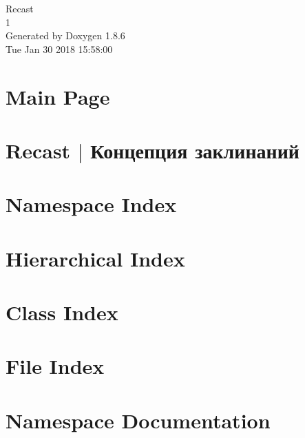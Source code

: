 \documentclass[twoside]{book}
\newcommand{\clearemptydoublepage}{%
  \newpage{\pagestyle{empty}\cleardoublepage}%
}
\begin{document}
\hypersetup{pageanchor=false}
\begin{titlepage}
\vspace*{7cm}
\begin{center}%
{\Large Recast \\[1ex]\large 1 }\\
\vspace*{1cm}
{\large Generated by Doxygen 1.8.6}\\
\vspace*{0.5cm}
{\small Tue Jan 30 2018 15:58:00}\\
\end{center}
\end{titlepage}
\clearemptydoublepage
\tableofcontents
\clearemptydoublepage
{}
\hypersetup{pageanchor=true}

\chapter{Main Page}
\label{index}\hypertarget{index}{}
\chapter{Recast $\vert$ Концепция заклинаний}
\label{md_custom-docs__nodes}
\hypertarget{md_custom-docs__nodes}{}

\chapter{Namespace Index}

\chapter{Hierarchical Index}

\chapter{Class Index}

\chapter{File Index}

\chapter{Namespace Documentation}





\end{document}
